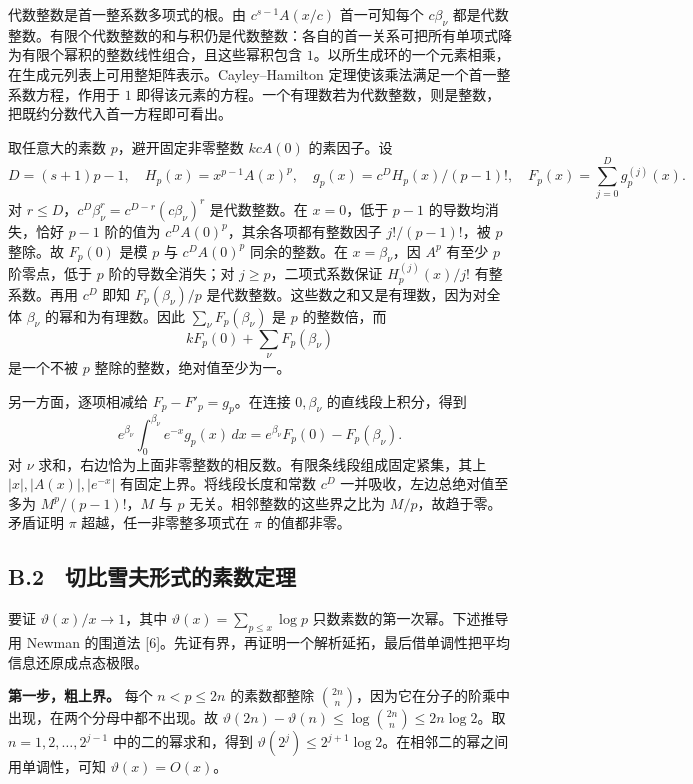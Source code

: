 \documentclass[11pt,a4paper]{article}
\begin{document}
代数整数是首一整系数多项式的根。由 \(c^{s-1}A(x/c)\) 首一可知每个 \(c\beta_\nu\) 都是代数整数。有限个代数整数的和与积仍是代数整数：各自的首一关系可把所有单项式降为有限个幂积的整数线性组合，且这些幂积包含 \(1\)。以所生成环的一个元素相乘，在生成元列表上可用整矩阵表示。Cayley--Hamilton 定理使该乘法满足一个首一整系数方程，作用于 \(1\) 即得该元素的方程。一个有理数若为代数整数，则是整数，把既约分数代入首一方程即可看出。

取任意大的素数 \(p\)，避开固定非零整数 \(kcA(0)\) 的素因子。设 \[
 D=(s+1)p-1,\quad H_p(x)=x^{p-1}A(x)^p,\quad
 g_p(x)=c^DH_p(x)/(p-1)!,\quad F_p(x)=\sum_{j=0}^{D}g_p^{(j)}(x).
\] 对 \(r\le D\)，\(c^D\beta_\nu^r=c^{D-r}(c\beta_\nu)^r\) 是代数整数。在 \(x=0\)，低于 \(p-1\) 的导数均消失，恰好 \(p-1\) 阶的值为 \(c^DA(0)^p\)，其余各项都有整数因子 \(j!/(p-1)!\)，被 \(p\) 整除。故 \(F_p(0)\) 是模 \(p\) 与 \(c^DA(0)^p\) 同余的整数。在 \(x=\beta_\nu\)，因 \(A^p\) 有至少 \(p\) 阶零点，低于 \(p\) 阶的导数全消失；对 \(j\ge p\)，二项式系数保证 \(H_p^{(j)}(x)/j!\) 有整系数。再用 \(c^D\) 即知 \(F_p(\beta_\nu)/p\) 是代数整数。这些数之和又是有理数，因为对全体 \(\beta_\nu\) 的幂和为有理数。因此 \(\sum_\nu F_p(\beta_\nu)\) 是 \(p\) 的整数倍，而 \[
 kF_p(0)+\sum_\nu F_p(\beta_\nu)
\] 是一个不被 \(p\) 整除的整数，绝对值至少为一。

另一方面，逐项相减给 \(F_p-F'_p=g_p\)。在连接 \(0,\beta_\nu\) 的直线段上积分，得到 \[
 e^{\beta_\nu}\int_0^{\beta_\nu}e^{-x}g_p(x)\,dx
 =e^{\beta_\nu}F_p(0)-F_p(\beta_\nu).
\] 对 \(\nu\) 求和，右边恰为上面非零整数的相反数。有限条线段组成固定紧集，其上 \(|x|,|A(x)|,|e^{-x}|\) 有固定上界。将线段长度和常数 \(c^D\) 一并吸收，左边总绝对值至多为 \(M^p/(p-1)!\)，\(M\) 与 \(p\) 无关。相邻整数的这些界之比为 \(M/p\)，故趋于零。矛盾证明 \(\pi\) 超越，任一非零整多项式在 \(\pi\) 的值都非零。

\subsection{B.2　切比雪夫形式的素数定理}\label{c.2-ux5207ux6bd4ux96eaux592bux5f62ux5f0fux7684ux7d20ux6570ux5b9aux7406}

要证 \(\vartheta(x)/x\to1\)，其中 \(\vartheta(x)=\sum_{p\le x}\log p\) 只数素数的第一次幂。下述推导用 Newman 的围道法 {[}6{]}。先证有界，再证明一个解析延拓，最后借单调性把平均信息还原成点态极限。

\textbf{第一步，粗上界。} 每个 \(n<p\le2n\) 的素数都整除 \(\binom{2n}n\)，因为它在分子的阶乘中出现，在两个分母中都不出现。故 \(\vartheta(2n)-\vartheta(n)\le\log\binom{2n}n\le2n\log2\)。取 \(n=1,2,\ldots,2^{j-1}\) 中的二的幂求和，得到 \(\vartheta(2^j)\le2^{j+1}\log2\)。在相邻二的幂之间用单调性，可知 \(\vartheta(x)=O(x)\)。
\end{document}
